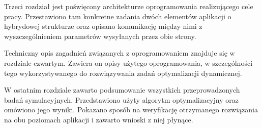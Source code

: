 Trzeci rozdział jest poświęcony architekturze oprogramowania realizującego cele pracy. Przestawiono tam konkretne zadania dwóch elementów aplikacji o hybrydowej strukturze oraz opisano komunikację między nimi z wyszczególnieniem parametrów wysyłanych przez obie strony.

Techniczny opis zagadnień związanych z oprogramowaniem znajduje się w rozdziale czwartym. Zawiera on opisy użytego oprogramowania, w szczególności tego wykorzystywanego do rozwiązywania zadań optymalizacji dynamicznej.

W ostatnim rozdziale zawarto podsumowanie wszystkich przeprowadzonych badań symulacyjnych. Przedstawiono użyty algorytm optymalizacyjny oraz omówiono jego wyniki. Pokazano sposób na weryfikację otrzymanego rozwiązania na obu poziomach aplikacji i zawarto wnioski z niej płynące.